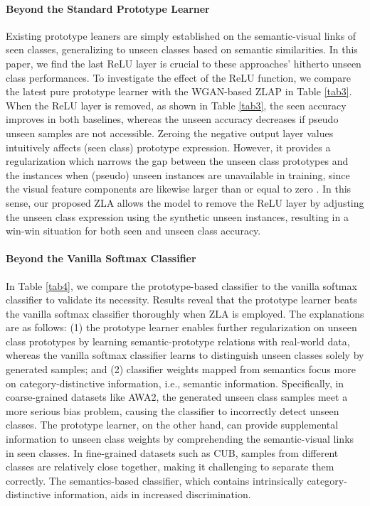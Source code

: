 \documentclass{article}
\begin{document}
\paragraph{Beyond the Standard Prototype Learner}
Existing prototype leaners \cite{li2019rethinking,skorokhodov2020class} are simply established on the semantic-visual links of seen classes, generalizing to unseen classes based on semantic similarities. In this paper, we find the last ReLU layer is crucial to these approaches' hitherto unseen class performances. To investigate the effect of the ReLU function, we compare the latest pure prototype learner \cite{skorokhodov2020class} with the WGAN-based ZLAP in Table \ref{tab3}. When the ReLU layer is removed, as shown in Table \ref{tab3}, the seen accuracy improves in both baselines, whereas the unseen accuracy decreases if pseudo unseen samples are not accessible. Zeroing the negative output layer values intuitively affects (seen class) prototype expression. However, it provides a regularization which narrows the gap between the unseen class prototypes and the instances when (pseudo) unseen instances are unavailable in training, since the visual feature components are likewise larger than or equal to zero \cite{xian2017zero}. In this sense, our proposed ZLA allows the model to remove the ReLU layer by adjusting the unseen class expression using the synthetic unseen instances, resulting in a win-win situation for both seen and unseen class accuracy.

\paragraph{Beyond the Vanilla Softmax Classifier}
In Table \ref{tab4}, we compare the prototype-based classifier to the vanilla softmax classifier to validate its necessity. Results reveal that the prototype learner beats the vanilla softmax classifier thoroughly when ZLA is employed. The explanations are as follows: (1) the prototype learner enables further regularization on unseen class prototypes by learning semantic-prototype relations with real-world data, whereas the vanilla softmax classifier learns to distinguish unseen classes solely by generated samples; and (2) classifier weights mapped from semantics focus more on category-distinctive information, i.e., semantic information. Specifically, in coarse-grained datasets like AWA2, the generated unseen class samples meet a more serious bias problem, causing the classifier to incorrectly detect unseen classes. The prototype learner, on the other hand, can provide supplemental information to unseen class weights by comprehending the semantic-visual links in seen classes. In fine-grained datasets such as CUB, samples from different classes are relatively close together, making it challenging to separate them correctly. The semantics-based classifier, which contains intrinsically category-distinctive information, aids in increased discrimination.
\end{document}
